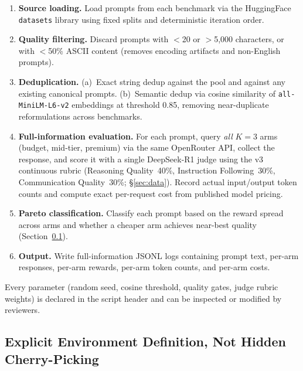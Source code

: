 \begin{enumerate}[nosep,leftmargin=*]
  \item \textbf{Source loading.}
    Load prompts from each benchmark via the HuggingFace \texttt{datasets}
    library using fixed splits and deterministic iteration order.

  \item \textbf{Quality filtering.}
    Discard prompts with $<$20 or $>$5{,}000 characters, or with
    $<$50\% ASCII content (removes encoding artifacts and non-English prompts).

  \item \textbf{Deduplication.}
    (a)~Exact string dedup against the pool and against any existing
    canonical prompts.
    (b)~Semantic dedup via cosine similarity of
    \texttt{all-MiniLM-L6-v2} embeddings at threshold 0.85, removing
    near-duplicate reformulations across benchmarks.

  \item \textbf{Full-information evaluation.}
    For each prompt, query \emph{all} $K{=}3$ arms (budget, mid-tier,
    premium) via the same OpenRouter API, collect the response, and
    score it with a single DeepSeek-R1 judge using the v3 continuous
    rubric (Reasoning Quality~40\%, Instruction Following~30\%,
    Communication Quality~30\%; \S\ref{sec:data}).
    Record actual input/output token counts and compute exact
    per-request cost from published model pricing.

  \item \textbf{Pareto classification.}
    Classify each prompt based on the reward spread across arms and
    whether a cheaper arm achieves near-best quality
    (Section~\ref{app:pareto_classification}).

  \item \textbf{Output.}
    Write full-information JSONL logs containing prompt text, per-arm
    responses, per-arm rewards, per-arm token counts, and per-arm costs.
\end{enumerate}

Every parameter (random seed, cosine threshold, quality gates, judge
rubric weights) is declared in the script header and can be inspected
or modified by reviewers.

\subsection{Explicit Environment Definition, Not Hidden Cherry-Picking}
\label{app:pareto_classification}

